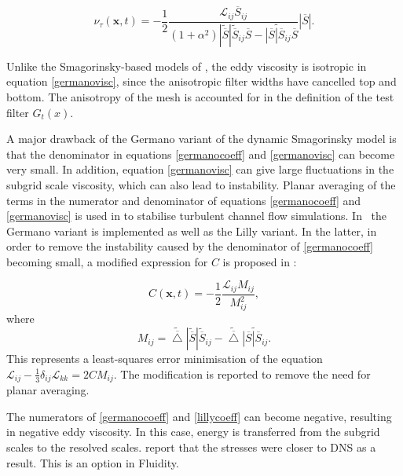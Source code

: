 \begin{equation}\label{germanovisc}
\nu_\tau(\mathbf x, t) = - \frac{1}{2} \frac{\mathcal L_{ij} \overline S_{ij}}
{(1+\alpha^2) | \widetilde{\overline S} | \widetilde{\overline S}_{ij} \overline S -
\widetilde{ | \overline S | \overline S_{ij}} \overline S}
\left | \overline S \right |.
\end{equation}

Unlike the Smagorinsky-based models of \citet{bentham2003}, the eddy viscosity is isotropic in equation \eqref{germanovisc}, since the anisotropic filter widths have cancelled top and bottom. The anisotropy of the mesh is accounted for in the definition of the test filter $G_t(x)$.

A major drawback of the Germano variant of the dynamic Smagorinsky model is that the denominator in
equations \eqref{germanocoeff} and \eqref{germanovisc} can become very small. In addition, equation
\eqref{germanovisc} can give large fluctuations in the subgrid scale viscosity, which can also lead to
instability. Planar averaging of the terms in the numerator and denominator of equations
\eqref{germanocoeff} and \eqref{germanovisc} is used in \cite{germano1991} to stabilise turbulent
channel flow simulations. In \fluidity\ the Germano variant is implemented as well as the Lilly
variant. In the latter, in order to remove the instability caused by the denominator of
\eqref{germanocoeff} becoming small, a modified expression for $C$ is proposed in \cite{lilly1991}:

\begin{equation}\label{lillycoeff}
C(\mathbf x, t) = - \frac{1}{2} \frac{\mathcal L_{ij} M_{ij}}{M^2_{ij}},
\end{equation}
where
\begin{equation}\label{eqn:lilly_m_tensor}
M_{ij} = {\widetilde{\overline \bigtriangleup} | \widetilde{\overline S} | \widetilde{\overline S}_{ij} -
\widetilde{\overline \bigtriangleup} \widetilde{ | \overline S | \overline S_{ij}}}.
\end{equation}
This represents a least-squares error minimisation of the equation $\mathcal L_{ij} - \frac 1 3 \delta_{ij} \mathcal L_{kk} = 2CM_{ij}$. The modification is reported to remove the need for planar averaging.

The numerators of \eqref{germanocoeff} and \eqref{lillycoeff} can become negative, resulting in negative eddy viscosity. In this case, energy is transferred from the subgrid scales to the resolved scales. \citet{germano1991} report that the stresses were closer to DNS as a result. This is an option in Fluidity.%

